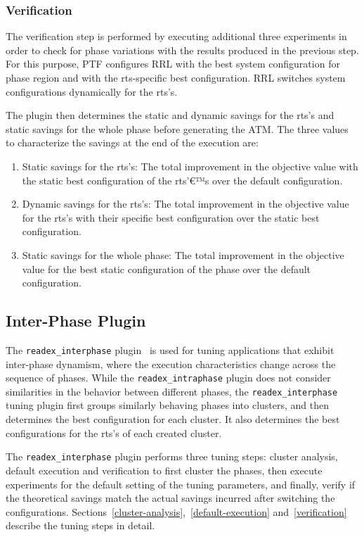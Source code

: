 \subsubsection{Verification} \label{intra-verification} 

The verification step is performed by executing additional three experiments in order to check for phase variations with the results produced in the previous step. For this purpose, PTF configures RRL with the best system configuration for phase region and with the rts-specific best configuration. RRL switches system configurations dynamically for the rts's. 

The plugin then determines the static and dynamic savings for the rts's and static savings for the whole phase before generating the ATM. The three values to characterize the savings at the end of the execution are:

\begin{enumerate}
	\item Static savings for the rts's: The total improvement in the objective value with the static best configuration of the rts'€™s over the default configuration. 
	\item Dynamic savings for the rts's: The total improvement in the objective value for the rts's with their specific best configuration over the static best configuration.
	\item Static savings for the whole phase: The total improvement in the objective value for the best static configuration of the phase over the default configuration.
\end{enumerate}


\subsection{Inter-Phase Plugin} \label{sec:inter-phase}

The \texttt{readex\_interphase} plugin~\cite{PDPTA_18_Kumaraswamy} is used for tuning applications that exhibit inter-phase dynamism, where the execution characteristics change across the sequence of phases. While the \texttt{readex\_intraphase} plugin does not consider similarities in the behavior between different phases, the \texttt{readex\_interphase} tuning plugin first groups similarly behaving phases into clusters, and then determines the best configuration for each cluster. It also determines the best configurations for the rts's of each created cluster.

The \texttt{readex\_interphase} plugin performs three tuning steps: cluster analysis, default execution and verification to first cluster the phases, then execute experiments for the default setting of the tuning parameters, and finally, verify if the theoretical savings match the actual savings incurred after switching the configurations. Sections~\ref{cluster-analysis},~\ref{default-execution} and~\ref{verification} describe the tuning steps in detail.

